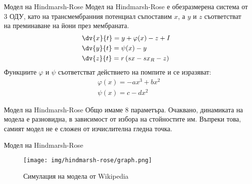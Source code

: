 \begin{frame}[t]{Модел на Hindmarsh-Rose}
  Модел на Hindmarsh-Rose е обезразмерена система от 3 ОДУ,
  като на трансмембранния потенциал съпоставим $x$,
  а $y$ и $z$ съответстват на преминаване на йони през мембраната.
  \begin{align*}
    &\dv{x}{t}=y + \varphi(x) - z + I\\
    &\dv{y}{t}=\psi(x) - y\\
    &\dv{z}{t}=r\left(sx - sx_R - z\right)
  \end{align*}
  Функциите $\varphi$ и $\psi$ съответстват действието на помпите и се изразяват:
  \begin{align*}
    &\varphi(x) = -ax^3 + bx^2\\
    &\psi(x) = c - dx^2
  \end{align*}
\end{frame}

\begin{frame}[t]{Модел на Hindmarsh-Rose}
  Общо имаме 8 параметъра. Очаквано, динамиката на модела е разновидна, в зависимост от избора на стойностите им.
  Въпреки това, самият модел не е сложен от изчислителна гледна точка.
\end{frame}

\begin{frame}[t]{Модел на Hindmarsh-Rose}
  \begin{figure}[htbp!]
    \centering
    \texttt{[image: img/hindmarsh-rose/graph.png]}
    \caption{Симулация на модела от Wikipedia}
  \end{figure}
\end{frame}
